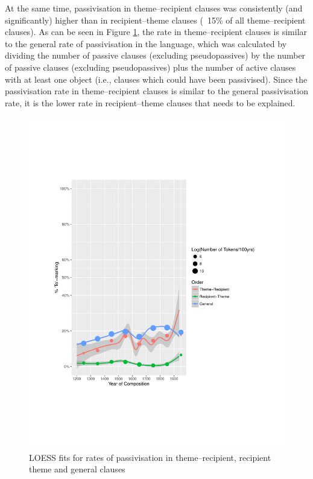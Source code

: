 	At the same time, passivisation in theme--recipient clauses was consistently (and significantly) higher than in recipient--theme clauses (~15\% of all theme--recipient clauses). As can be seen in Figure \ref{fig:brit-pas}, the rate in theme--recipient clauses is similar to the general rate of passivisation in the language, which was calculated by dividing the number of passive clauses (excluding pseudopassives) by the number of passive clauses (excluding pseudopassives) plus the number of active clauses with at least one object (i.e., clauses which could have been passivised). Since the passivisation rate in theme--recipient clauses is similar to the general passivisation rate, it is the lower rate in recipient--theme clauses that needs to be explained.

	\begin{figure}[ht!]
		\includegraphics[width=\linewidth]{../images/brit-pas}
		\caption{LOESS fits for rates of passivisation in theme--recipient, recipient theme and general clauses}
		\label{fig:brit-pas}
	\end{figure}

